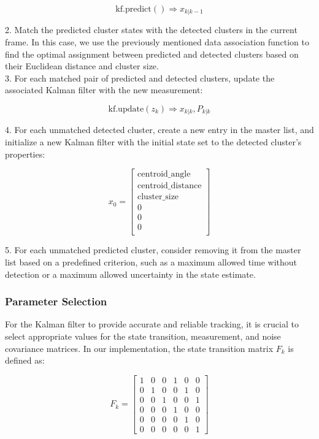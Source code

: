 \documentclass[journal]{IEEEtran} %
\begin{document}
   \[
   \mathrm{kf.predict()} \Rightarrow x_{k|k-1}
   \]

2. Match the predicted cluster states with the detected clusters in the current frame. In this case, we use the previously mentioned data association function to find the optimal assignment between predicted and detected clusters based on their Euclidean distance and cluster size.\\

3. For each matched pair of predicted and detected clusters, update the associated Kalman filter with the new measurement:

   \[
   \mathrm{kf.update}(z_k) \Rightarrow x_{k|k}, P_{k|k}
   \]

4. For each unmatched detected cluster, create a new entry in the master list, and initialize a new Kalman filter with the initial state set to the detected cluster's properties:

\[
x_0 = \begin{bmatrix}
\text{centroid\_angle} \\
\text{centroid\_distance} \\
\text{cluster\_size} \\
0 \\
0 \\
0\\
\end{bmatrix}
\]

5. For each unmatched predicted cluster, consider removing it from the master list based on a predefined criterion, such as a maximum allowed time without detection or a maximum allowed uncertainty in the state estimate.\\

\subsubsection{Parameter Selection}

For the Kalman filter to provide accurate and reliable tracking, it is crucial to select appropriate values for the state transition, measurement, and noise covariance matrices. In our implementation, the state transition matrix $F_k$ is defined as:

\[
F_k = \begin{bmatrix}
1 & 0 & 0 & 1 & 0 & 0 \\
0 & 1 & 0 & 0 & 1 & 0 \\
0 & 0 & 1 & 0 & 0 & 1 \\
0 & 0 & 0 & 1 & 0 & 0 \\
0 & 0 & 0 & 0 & 1 & 0 \\
0 & 0 & 0 & 0 & 0 & 1
\end{bmatrix}
\]
\end{document}
